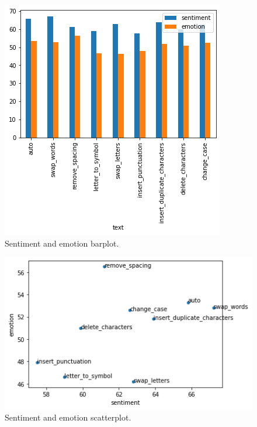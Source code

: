 \documentclass[11pt,a4paper]{article}
\begin{document}
\begin{figure}[ht]
    \centering
    \includegraphics[width=\linewidth]{barplot_sentiment_emotion.png}
    \caption{Sentiment and emotion barplot.}
    \label{fig:barplot}
\end{figure}

\begin{figure}[ht]
    \centering
    \includegraphics[width=\linewidth]{scatterplot_sentiment_emotion.png}
    \caption{Sentiment and emotion scatterplot.}
    \label{fig:scatterplot}
\end{figure}
\end{document}
